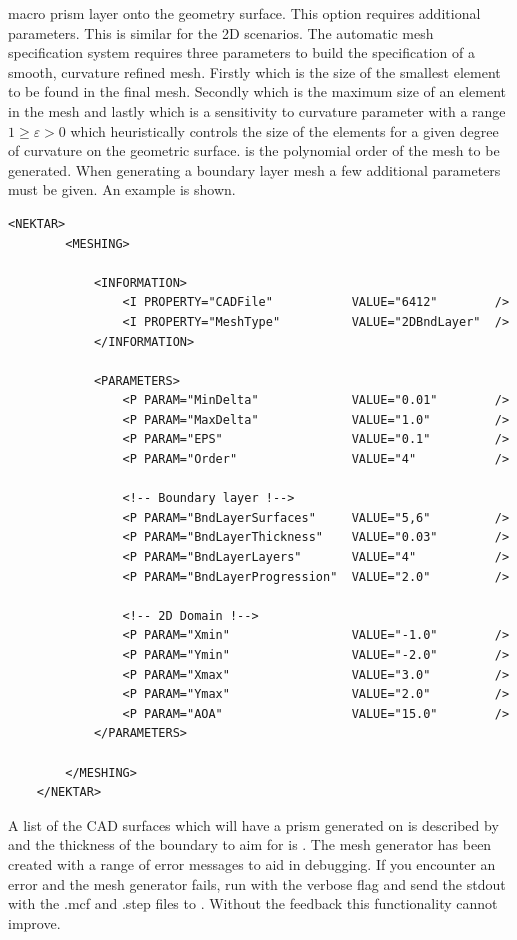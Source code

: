 macro prism layer onto the geometry surface. This option requires additional
parameters. This is similar for the 2D scenarios. The automatic mesh
specification system requires three parameters to build the specification of a
smooth, curvature refined mesh. Firstly  which is the size of
the smallest element to be found in the final mesh. Secondly 
which is the maximum size of an element in the mesh and lastly  which
is a sensitivity to curvature parameter with a range $1 \geq \varepsilon > 0$
which heuristically controls the size of the elements for a given degree of
curvature on the geometric surface.  is the polynomial order of the
mesh to be generated.
%
When generating a boundary layer mesh a few additional parameters must be given.
An example is shown.
\begin{lstlisting}[style=XmlStyle]
    <NEKTAR>
        <MESHING>

            <INFORMATION>
                <I PROPERTY="CADFile"           VALUE="6412"        />
                <I PROPERTY="MeshType"          VALUE="2DBndLayer"  />
            </INFORMATION>

            <PARAMETERS>
                <P PARAM="MinDelta"             VALUE="0.01"        />
                <P PARAM="MaxDelta"             VALUE="1.0"         />
                <P PARAM="EPS"                  VALUE="0.1"         />
                <P PARAM="Order"                VALUE="4"           />

                <!-- Boundary layer !-->
                <P PARAM="BndLayerSurfaces"     VALUE="5,6"         />
                <P PARAM="BndLayerThickness"    VALUE="0.03"        />
                <P PARAM="BndLayerLayers"       VALUE="4"           />
                <P PARAM="BndLayerProgression"  VALUE="2.0"         />

                <!-- 2D Domain !-->
                <P PARAM="Xmin"                 VALUE="-1.0"        />
                <P PARAM="Ymin"                 VALUE="-2.0"        />
                <P PARAM="Xmax"                 VALUE="3.0"         />
                <P PARAM="Ymax"                 VALUE="2.0"         />
                <P PARAM="AOA"                  VALUE="15.0"        />
            </PARAMETERS>

        </MESHING>
    </NEKTAR>
\end{lstlisting}
A list of the CAD surfaces which will have a prism generated on is described by
 and the thickness of the boundary to aim for is .
%
The mesh generator has been created with a range of error messages to aid in
debugging. If you encounter an error and the mesh generator fails, run \nm with
the verbose  flag and send the stdout with the .mcf and .step files
to . Without the feedback this functionality
cannot improve.

